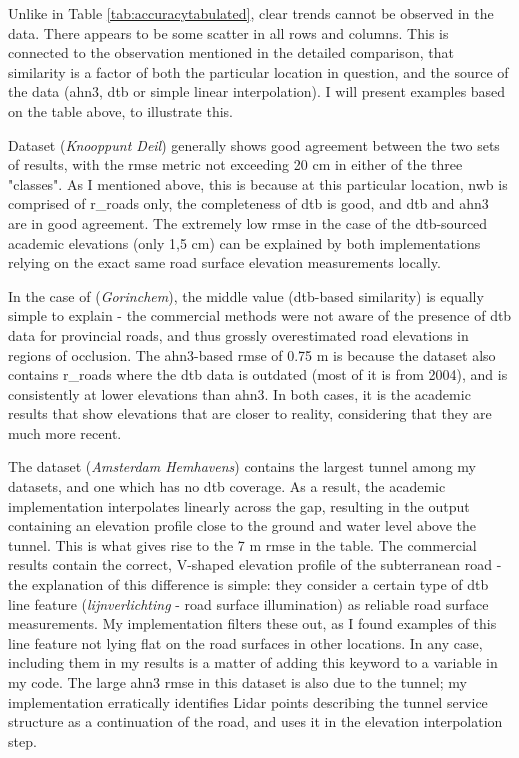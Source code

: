 Unlike in Table \ref{tab:accuracytabulated}, clear trends cannot be observed in the data. There appears to be some scatter in all rows and columns. This is connected to the observation mentioned in the detailed comparison, that similarity is a factor of both the particular location in question, and the source of the data (\ac{ahn3}, \ac{dtb} or simple linear interpolation). I will present examples based on the table above, to illustrate this.

Dataset  (\textit{Knooppunt Deil}) generally shows good agreement between the two sets of results, with the \ac{rmse} metric not exceeding 20 cm in either of the three "classes". As I mentioned above, this is because at this particular location, \ac{nwb} is comprised of \ac{r_road}s only, the completeness of \ac{dtb} is good, and \ac{dtb} and \ac{ahn3} are in good agreement. The extremely low \ac{rmse} in the case of the \ac{dtb}-sourced academic elevations (only 1,5 cm) can be explained by both implementations relying on the exact same road surface elevation measurements locally.

In the case of  (\textit{Gorinchem}), the middle value (\ac{dtb}-based similarity) is equally simple to explain - the commercial methods were not aware of the presence of \ac{dtb} data for provincial roads, and thus grossly overestimated road elevations in regions of occlusion. The \ac{ahn3}-based \ac{rmse} of 0.75 m is because the dataset also contains \ac{r_road}s where the \ac{dtb} data is outdated (most of it is from 2004), and is consistently at lower elevations than \ac{ahn3}. In both cases, it is the academic results that show elevations that are closer to reality, considering that they are much more recent.

The dataset  (\textit{Amsterdam Hemhavens}) contains the largest tunnel among my datasets, and one which has no \ac{dtb} coverage. As a result, the academic implementation interpolates linearly across the gap, resulting in the output containing an elevation profile close to the ground and water level above the tunnel. This is what gives rise to the 7 m \ac{rmse} in the table. The commercial results contain the correct, V-shaped elevation profile of the subterranean road - the explanation of this difference is simple: they consider a certain type of \ac{dtb} line feature (\textit{lijnverlichting} - road surface illumination) as reliable road surface measurements. My implementation filters these out, as I found examples of this line feature not lying flat on the road surfaces in other locations. In any case, including them in my results is a matter of adding this keyword to a variable in my code. The large \ac{ahn3} \ac{rmse} in this dataset is also due to the tunnel; my implementation erratically identifies Lidar points describing the tunnel service structure as a continuation of the road, and uses it in the elevation interpolation step.

